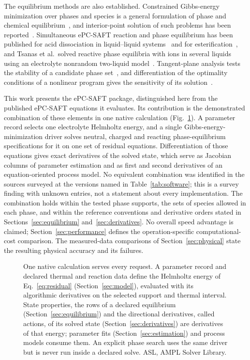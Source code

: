 The equilibrium methods are also established.
Constrained Gibbs-energy minimization over phases and species is a general formulation of phase and chemical equilibrium~\citep{Pereira2012,Tsanas2019,Coatleven2022}, and interior-point solution of such problems has been reported~\citep{Belov2023}.
Simultaneous ePC-SAFT reaction and phase equilibrium has been published for acid dissociation in liquid--liquid systems~\citep{Ascani2022pH} and for esterification~\citep{Ascani2023}, and Tsanas et al.\ solved reactive phase equilibria with ions in several liquids using an electrolyte nonrandom two-liquid model~\citep{Tsanas2022}.
Tangent-plane analysis tests the stability of a candidate phase set~\citep{Michelsen1982}, and differentiation of the optimality conditions of a nonlinear program gives the sensitivity of its solution~\citep{pirnayOptimalSensitivityBased2012}.

This work presents the ePC-SAFT package, distinguished here from the published ePC-SAFT equations it evaluates.
Its contribution is the demonstrated combination of these elements in one native calculation (Fig.~\ref{fig:workflow}).
A parameter record selects one electrolyte Helmholtz energy, and a single Gibbs-energy-minimization driver solves neutral, charged and reacting phase-equilibrium specifications for it on one set of residual equations.
Differentiation of those equations gives exact derivatives of the solved state, which serve as Jacobian columns of parameter estimation and as first and second derivatives of an equation-oriented process model.
No equivalent combination was identified in the sources surveyed at the versions named in Table~\ref{tab:software}; this is a survey finding with unknown entries, not a statement about every implementation.
The combination holds within the tested phase supports, the sets of species allowed in each phase, and within the reference conventions and derivative orders stated in Sections~\ref{sec:equilibrium} and~\ref{sec:derivatives}.
No overall speed advantage is claimed; Section~\ref{sec:performance} defines the operation-specific computational-cost comparison.
The measured-data comparisons of Section~\ref{sec:physical} state the resulting physical accuracy and its failures.

\begin{figure}[pos=H]
\centering

\caption{One native calculation serves every request.
A parameter record and declared thermal and reaction data define the Helmholtz energy of Eq.~\eqref{eq:residual} (Section~\ref{sec:model}), evaluated with its algorithmic derivatives on the selected support and thermal interval.
State properties, the rows of a declared equilibrium (Section~\ref{sec:equilibrium}) and the directional derivatives, called actions, of its solved state (Section~\ref{sec:derivatives}) are derivatives of that energy; parameter fits (Section~\ref{sec:estimation}) and process models consume them.
An explicit phase search uses the same driver but is never run inside a declared solve.
ASL, AMPL Solver Library.}
\label{fig:workflow}
\end{figure}



